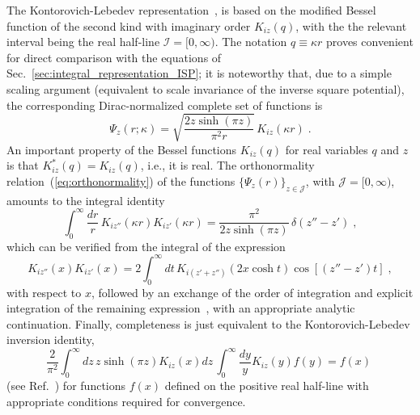 \documentclass[a4paper,preprint,draft,showpacs,amsmath,amsfonts,amssymb,aps,prd]{revtex4}%
\begin{document}
The Kontorovich-Lebedev representation~\cite{kontorovich},
is based on the modified Bessel function
of the second kind with imaginary order
$K_{iz}(q)$, with the 
the relevant interval being the real half-line
${\mathcal I} = [0,\infty)$.
The notation
$q \equiv \kappa r$
proves convenient  for direct comparison with the equations of 
Sec.~\ref{sec:integral_representation_ISP}; it is noteworthy that, due to a simple
scaling argument (equivalent to scale
invariance of the inverse square potential), 
the corresponding Dirac-normalized complete set of functions
is
\begin{equation}
\Psi_{z} (r;\kappa)
=
\sqrt{  \frac{ 2 z \sinh ( \pi z )  }{ \pi^{2} r }  }
\,
K_{iz} (\kappa r) 
\;   .
\end{equation}
An important property of the Bessel functions $K_{iz}(q)$ for real variables
$q$ and $z$ is that
$
K_{iz}^{*}(q) =
K_{iz}(q)$,
i.e., it is real.
The orthonormality relation~(\ref{eq:orthonormality})
of the functions $\{ \Psi_{z} (r) \}_{ z \in {\mathcal J}}$, with ${\mathcal J} =[0,\infty)$,
amounts to the integral identity
\begin{equation}
\int_{0}^{\infty}
\frac{dr}{r}
\,
K_{iz''} (\kappa r) 
K_{iz'} (\kappa r) 
=
\frac{ \pi^{2}  }{ 2 z \sinh ( \pi z )  }
\,
\delta (z''-z')
\;  ,
\label{eq:orthonormality_KL}
\end{equation}
which can be verified
from the integral of the expression~\cite{wat:44b}
\begin{equation}
K_{iz''} (x) 
K_{iz'} (x) 
=
2 
\int_{0}^{\infty}
dt 
\,
K_{i(z'+z'')} (2x \cosh t) 
\cos \left[ 
\left( z''-z'
\right) t
\right]
\;  ,
\label{eq:orthonormality_KL_aux}
\end{equation}
with respect to $x$,
followed by an exchange of the order of integration
and explicit integration of the remaining expression~\cite{gra:00},
with an appropriate analytic continuation. 
Finally,
completeness is just equivalent to the Kontorovich-Lebedev inversion 
identity, 
\begin{equation}
\frac{2}{ \pi^{2}}
\int_{0}^{\infty} 
dz
\,
 z \sinh ( \pi z )  K_{iz} (x) dz
\,
\int_{0}^{\infty} \frac{dy}{  y }  
  K_{iz} (y)
f(y)
=
f  ( x)
\;
\end{equation}
(see Ref.~\cite{kontorovich})
for functions $f(x)$ defined on the positive real half-line with appropriate 
conditions required for convergence.
\end{document}
